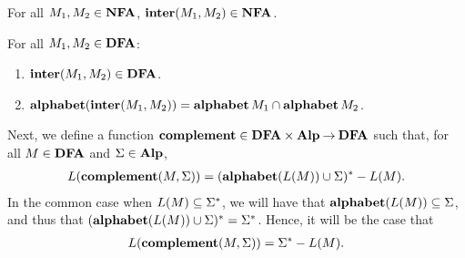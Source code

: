 %
%
%
\begin{proposition}
For all $M_1,M_2\in\mathbf{NFA}$, $\mathbf{inter}(M_1,M_2)\in\mathbf{NFA}$.
\end{proposition}

%
%
%
\begin{proposition}
For all $M_1,M_2\in\mathbf{DFA}$:
\begin{enumerate}[\quad(1)]
\item $\mathbf{inter}(M_1,M_2)\in\mathbf{DFA}$.

\item $\mathbf{alphabet}(\mathbf{inter}(M_1,M_2)) = \mathbf{alphabet}\,M_1\cap\mathbf{alphabet}\,M_2$.
\end{enumerate}
\end{proposition}

%
%
%
Next, we define a function $\mathbf{complement}\in\mathbf{DFA}\times\mathbf{Alp}\mathbin{\to}\mathbf{DFA}$
such that, for all $M\in\mathbf{DFA}$ and $\Sigma\in\mathbf{Alp}$,
\begin{gather*}
L(\mathbf{complement}(M,\Sigma)) = (\mathbf{alphabet}(L(M))\cup\Sigma)^*-L(M) .
\end{gather*}
In the common case when $L(M)\subseteq\Sigma^*$, we will have that
$\mathbf{alphabet}(L(M))\subseteq\Sigma$, and thus that
$(\mathbf{alphabet}(L(M))\cup\Sigma)^*=\Sigma^*$.  Hence, it will be the case
that
\begin{gather*}
L(\mathbf{complement}(M,\Sigma)) = \Sigma^*-L(M) .
\end{gather*}

